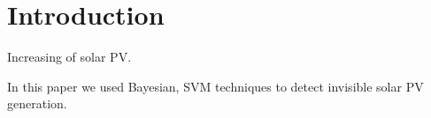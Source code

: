 \section{Introduction}

Increasing of solar PV.

In this paper we used Bayesian, SVM techniques to detect invisible solar PV generation.
